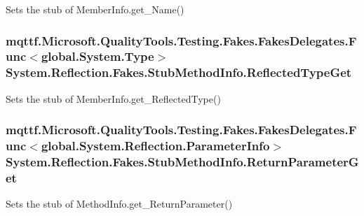 Sets the stub of Member\-Info.\-get\-\_\-\-Name()

\hypertarget{class_system_1_1_reflection_1_1_fakes_1_1_stub_method_info_ae8c73b608ec668823274fbd75c5b8e59}{
\subsubsection[{Reflected\-Type\-Get}]{\setlength{\rightskip}{0pt plus 5cm}mqttf.\-Microsoft.\-Quality\-Tools.\-Testing.\-Fakes.\-Fakes\-Delegates.\-Func$<$global.\-System.\-Type$>$ System.\-Reflection.\-Fakes.\-Stub\-Method\-Info.\-Reflected\-Type\-Get}}\label{class_system_1_1_reflection_1_1_fakes_1_1_stub_method_info_ae8c73b608ec668823274fbd75c5b8e59}


Sets the stub of Member\-Info.\-get\-\_\-\-Reflected\-Type()

\hypertarget{class_system_1_1_reflection_1_1_fakes_1_1_stub_method_info_ace6aa764a8393988a10fca16063a638c}{
\subsubsection[{Return\-Parameter\-Get}]{\setlength{\rightskip}{0pt plus 5cm}mqttf.\-Microsoft.\-Quality\-Tools.\-Testing.\-Fakes.\-Fakes\-Delegates.\-Func$<$global.\-System.\-Reflection.\-Parameter\-Info$>$ System.\-Reflection.\-Fakes.\-Stub\-Method\-Info.\-Return\-Parameter\-Get}}\label{class_system_1_1_reflection_1_1_fakes_1_1_stub_method_info_ace6aa764a8393988a10fca16063a638c}


Sets the stub of Method\-Info.\-get\-\_\-\-Return\-Parameter()

